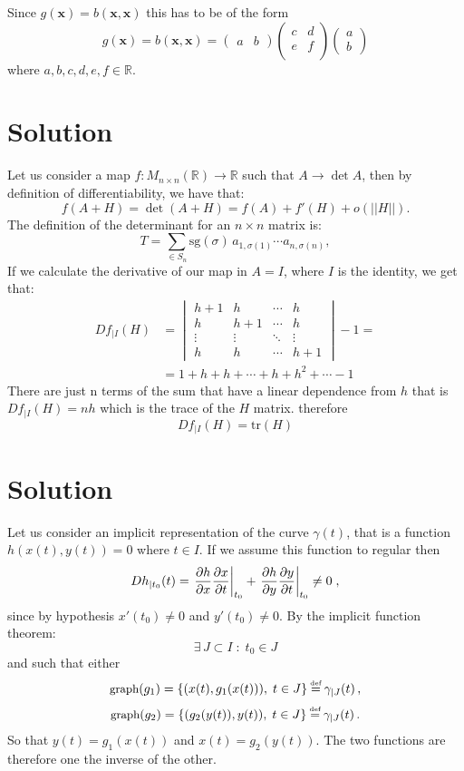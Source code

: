 \documentclass{article}[a4paper]
\newcommand*{\eqdef}{\ensuremath{\overset{\mathclap{\text{\tiny def}}}{=}}}
\begin{document}
   Since $g(\mathbf{x}) = b(\mathbf{x,x})$ this has to be of the form 
   \[
    g(\mathbf{x}) = b(\mathbf{x,x})=
    \begin{pmatrix}
        a & b
    \end{pmatrix}
    \begin{pmatrix}
        c & d\\
        e & f\\
    \end{pmatrix}
    \begin{pmatrix}
        a\\
        b
    \end{pmatrix}
   \]
   where $a,b,c,d,e,f \in \mathbb{R}$.
\section{Solution} %
    Let us consider a map $f: M_{n\times n} (\mathbb{R}) \to \mathbb{R}$ such that $A \to \det{A}$, then by definition of differentiability, we have that:
    \[
        f(A + H) = \det(A+H) = f(A) + f'(H) + o(||H||).
    \]
    The definition of the determinant for an $n\times n$ matrix is:
    \[
        T = \sum_{ \in S_n} \mbox{sg}(\sigma)\, a_{1, \sigma(1)} \cdots a_{n, \sigma(n)},
    \]
    If we calculate the derivative of our map in $A=I$, where $I$ is the identity, we get that:
    \[
        \begin{split}
            Df_{|I}(H) &= 
            \begin{vmatrix}
                h+1 & h & \cdots & h\\
                h & h+1 & \cdots & h\\
                \vdots & \vdots & \ddots & \vdots\\
                h & h & \cdots & h+1
            \end{vmatrix} - 1 =\\
            &= 1 + h + h + \cdots + h + h^2 + \cdots -1
        \end{split}
    \]
    There are just n terms of the sum that have a linear dependence from $h$ that is $Df_{|I}(H) = nh$ which is the trace of the $H$ matrix. therefore
    \[
        Df_{|I}(H) = \mbox{tr}(H) 
    \]
\section{Solution} %
Let us consider an implicit representation of the curve $\gamma(t)$, that is a function $h(x(t), y(t)) = 0$ where $t \in I$. If we assume this function to regular then
\[
    Dh_{|t_0} (t) = \left. \pdv{h}{x} \pdv{x}{t} \right|_{t_0} + \left. \pdv{h}{y} \pdv{y}{t} \right|_{t_0} \neq 0\; ,
\]
since by hypothesis $x'(t_0) \neq 0$ and $y'(t_0) \neq 0$. By the implicit function theorem:
\[
    \exists\, J \subset I\; :\; t_0 \in J 
\]
and such that either
\[
    \mbox{{\small graph}}(g_1) = \{ (x(t), g_1(x(t))),\; t \in J \} \eqdef \gamma_{|J}(t)\, ,
\]
\[
    \mbox{{\small graph}}(g_2) = \{ (g_2(y(t)), y(t)),\; t \in J \} \eqdef \gamma_{|J}(t)\, .
\]
So that $y(t) = g_1(x(t))$ and $x(t) = g_2 (y(t))$. The two functions are therefore one the inverse of the other.
\end{document}
